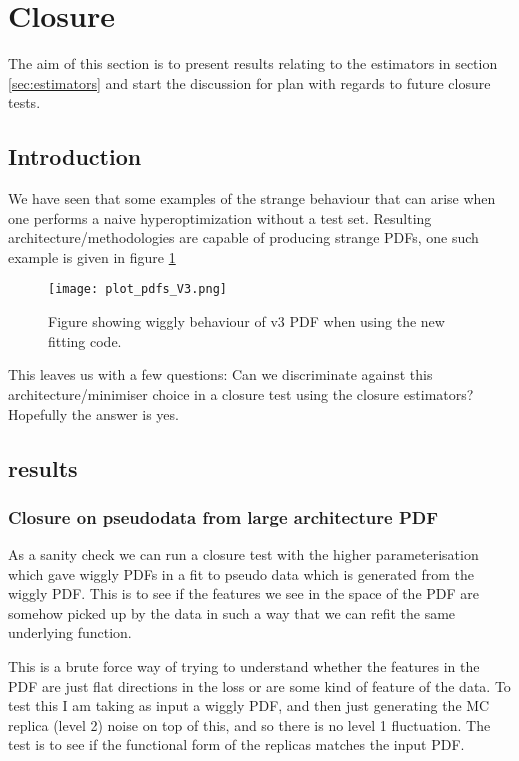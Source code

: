 \section{Closure}
\label{sec:closure}

The aim of this section is to present results relating to the estimators in
section \ref{sec:estimators} and start the discussion for plan with regards
to future closure tests.

\subsection{Introduction}

We have seen that some examples of the strange behaviour that can arise when one
performs a naive hyperoptimization without a test set. Resulting
architecture/methodologies are capable of producing strange PDFs, one such
example is given in figure \ref{fig:v3pdf}

\begin{figure}[!h]
    \centering
    \texttt{[image: plot\_pdfs\_V3.png]}
    \caption{
        Figure showing wiggly behaviour of v3 PDF when using the new fitting code.
        }
    \label{fig:v3pdf}
\end{figure}

This leaves us with a few questions: Can we discriminate against this
architecture/minimiser choice in a closure test using the closure estimators?
Hopefully the answer is yes.

\subsection{results}

\subsubsection*{Closure on pseudodata from large architecture PDF}

As a sanity check we can run a closure test with the higher parameterisation
which gave wiggly PDFs in a fit to pseudo data which is generated from the
wiggly PDF. This is to see if the features we see in the space of the PDF are
somehow picked up by the data in such a way that we can refit the same underlying
function.

This is a brute force way of trying to understand whether the features in the PDF
are just flat directions in the loss or are some kind of feature of the data. To
test this I am taking as input a wiggly PDF, and then just generating the MC
replica (level 2) noise on top of this, and so there is no level 1 fluctuation.
The test is to see if the functional form of the replicas matches the input PDF.

